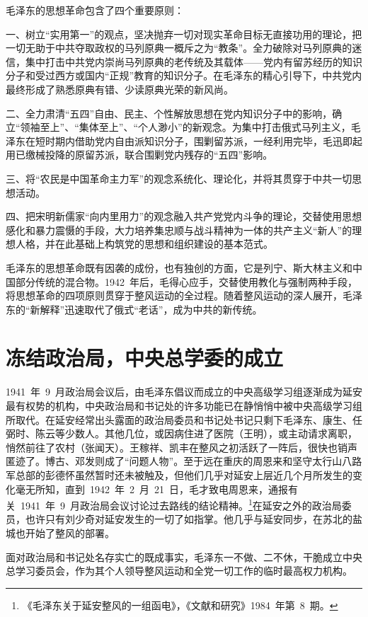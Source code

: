 毛泽东的思想革命包含了四个重要原则：

一、树立“实用第一”的观点，坚决抛弃一切对现实革命目标无直接功用的理论，把一切无助于中共夺取政权的马列原典一概斥之为“教条”。全力破除对马列原典的迷信，集中打击中共党内崇尚马列原典的老传统及其载体——党内有留苏经历的知识分子和受过西方或国内“正规”教育的知识分子。在毛泽东的精心引导下，中共党内最终形成了熟悉原典有错、少读原典光荣的新风尚。

二、全力肃清“五四”自由、民主、个性解放思想在党内知识分子中的影响，确立“领袖至上”、“集体至上”、“个人渺小”的新观念。为集中打击俄式马列主义，毛泽东在短时期内借助党内自由派知识分子，围剿留苏派，一经利用完毕，毛迅即起用已缴械投降的原留苏派，联合围剿党内残存的“五四”影响。

三、将“农民是中国革命主力军”的观念系统化、理论化，并将其贯穿于中共一切思想活动。

四、把宋明新儒家“向内里用力”的观念融入共产党党内斗争的理论，交替使用思想感化和暴力震慑的手段，大力培养集忠顺与战斗精神为一体的共产主义“新人”的理想人格，并在此基础上构筑党的思想和组织建设的基本范式。

毛泽东的思想革命既有因袭的成份，也有独创的方面，它是列宁、斯大林主义和中国部分传统的混合物。1942~年后，毛得心应手，交替使用教化与强制两种手段，将思想革命的四项原则贯穿于整风运动的全过程。随着整风运动的深人展开，毛泽东的“新解释”迅速取代了俄式“老话”，成为中共的新传统。

\section{冻结政治局，中央总学委的成立}

1941~年~9~月政治局会议后，由毛泽东倡议而成立的中央高级学习组逐渐成为延安最有权势的机构，中央政治局和书记处的许多功能已在静悄悄中被中央高级学习组所取代。在延安经常出头露面的政治局委员和书记处书记只剩下毛泽东、康生、任弼时、陈云等少数人。其他几位，或因病住进了医院（王明），或主动请求离职，悄然前往了农村（张闻天）。王稼祥、凯丰在整风之初活跃了一阵后，很快也销声匿迹了。博古、邓发则成了“问题人物”。至于远在重庆的周恩来和坚守太行山八路军总部的彭德怀虽然暂时还未被触及，但他们几乎对延安上层近几个月所发生的变化毫无所知，直到~1942~年~2~月~21~日，毛才致电周恩来，通报有关~1941~年~9~月政治局会议讨论过去路线的结论精神。\footnote{《毛泽东关于延安整风的一组函电》，《文献和研究》1984~年第~8~期。}在延安之外的政治局委员，也许只有刘少奇对延安发生的一切了如指掌。他几乎与延安同步，在苏北的盐城也开始了整风的部署。

面对政治局和书记处名存实亡的既成事实，毛泽东一不做、二不休，干脆成立中央总学习委员会，作为其个人领导整风运动和全党一切工作的临时最高权力机构。

